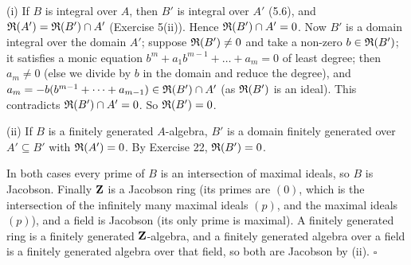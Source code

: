 \documentclass[11pt]{article}
\begin{document}
(i) If $B$ is integral over $A$, then $B'$ is integral over $A'$ (5.6), and $\mathfrak R(A')=\mathfrak R(B')\cap A'$ (Exercise 5(ii)). Hence $\mathfrak R(B')\cap A'=0$. Now $B'$ is a domain integral over the domain $A'$; suppose $\mathfrak R(B')\ne0$ and take a non-zero $b\in\mathfrak R(B')$; it satisfies a monic equation $b^m+a_1b^{m-1}+\dots+a_m=0$ of least degree; then $a_m\ne0$ (else we divide by $b$ in the domain and reduce the degree), and $a_m=-b(b^{m-1}+\dots+a_{m-1})\in\mathfrak R(B')\cap A'$ (as $\mathfrak R(B')$ is an ideal). This contradicts $\mathfrak R(B')\cap A'=0$. So $\mathfrak R(B')=0$.

(ii) If $B$ is a finitely generated $A$-algebra, $B'$ is a domain finitely generated over $A'\subseteq B'$ with $\mathfrak R(A')=0$. By Exercise 22, $\mathfrak R(B')=0$.

In both cases every prime of $B$ is an intersection of maximal ideals, so $B$ is Jacobson. Finally $\mathbf Z$ is a Jacobson ring (its primes are $(0)$, which is the intersection of the infinitely many maximal ideals $(p)$, and the maximal ideals $(p)$), and a field is Jacobson (its only prime is maximal). A finitely generated ring is a finitely generated $\mathbf Z$-algebra, and a finitely generated algebra over a field is a finitely generated algebra over that field, so both are Jacobson by (ii). \hfill$\square$
\end{document}

